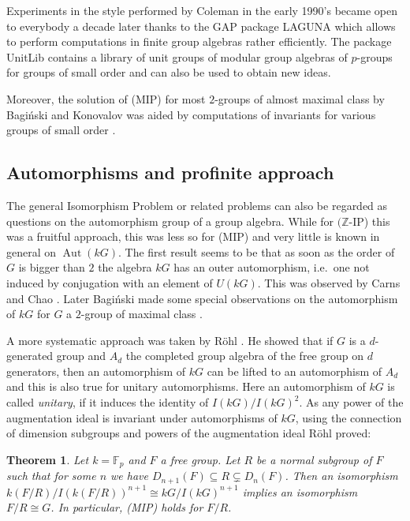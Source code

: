 \documentclass[11pt, a4paper]{amsart}
\newtheorem{theorem}{Theorem}[section]
\theoremstyle{definition}
\begin{document}
Experiments in the style performed by Coleman in the early 1990's became open to everybody a decade later thanks to the GAP package LAGUNA \cite{LAGUNA} which allows to perform computations in finite group algebras rather efficiently. The package UnitLib \cite{UnitLib} contains a library of unit groups of modular group algebras of $p$-groups for groups of small order and can also be used to obtain new ideas.

Moreover, the solution of (MIP) for most $2$-groups of almost maximal class by Bagi\'nski and Konovalov was aided by computations of invariants for various groups of small order  \cite{BaginskiKonovalov04}.

\subsection{Automorphisms and profinite approach} 

The general Isomorphism Problem or related problems can also be regarded as questions on the automorphism group of a group algebra. While for $(\mathbb{Z}$-IP) this was a fruitful approach, this was less so for (MIP) and very little is known in general on $\operatorname{Aut}(kG)$. The first result seems to be that as soon as the order of $G$ is bigger than $2$ the algebra $kG$ has an outer automorphism, i.e.\ one not induced by conjugation with an element of $U(kG)$. This was observed by Carns and Chao \cite{CarnsChao72}. Later Bagi\'nski made some special observations on the automorphism of $kG$ for $G$ a $2$-group of maximal class \cite{Baginski92}.

A more systematic approach was taken by R\"ohl \cite{Roehl87, Roehl90}. He showed that if $G$ is a $d$-generated group and $A_d$ the completed group algebra of the free group on $d$ generators, then an automorphism of $kG$ can be lifted to an automorphism of $A_d$ and this is also true for unitary automorphisms. Here an automorphism of $kG$ is called \emph{unitary}, if it induces the identity of $I(kG)/I(kG)^2$. As any power of the augmentation ideal is invariant under automorphisms of $kG$, using the connection of dimension subgroups and powers of the augmentation ideal R\"ohl proved:

\begin{theorem}\cite{Roehl90}
Let $k = \mathbb{F}_p$ and $F$ a free group. Let $R$ be a normal subgroup of $F$ such that for some $n$ we have $D_{n+1}(F) \subseteq R \subsetneq D_n(F)$. Then an isomorphism $k(F/R)/I(k(F/R))^{n+1} \cong kG/I(kG)^{n+1}$ implies an isomorphism $F/R \cong G$. In particular, (MIP) holds for $F/R$. 
\end{theorem}
\end{document}
